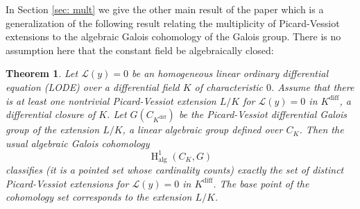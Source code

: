 \documentclass{amsart}
\newtheorem{theorem}{Theorem}[section]
\theoremstyle{definition}
\theoremstyle{remark}
\numberwithin{equation}{section}
\def \HH {\operatorname{H}}
\def \diff {\operatorname{diff}}
\def \alg {\operatorname{alg}}
\begin{document}
In Section \ref{sec: mult} we give the other main result of the paper which is a generalization of the following result relating the multiplicity of Picard-Vessiot extensions to the algebraic Galois cohomology of the Galois group. There is no assumption here that the constant field be algebraically closed:

\begin{theorem}\label{fact: counting PV}\cite{KamenskyPillay}\cite{DeligneMilne2022} Let $\mathcal{L}(y)=0$ be an  homogeneous linear ordinary differential equation (LODE) over a differential field $K$ of characteristic $0$. Assume that there is at least one nontrivial Picard-Vessiot extension $L/K$ for $\mathcal{L}(y)=0$ in $K^{\diff}$, a differential closure of $K$. Let $G(C_{K^{\diff}})$ be the Picard-Vessiot differential Galois group of the extension $L/K$, a linear algebraic group defined over $C_K$. Then the usual algebraic Galois cohomology $$\HH^1_{\alg}(C_K,G)$$
classifies (it is a pointed set whose cardinality counts) exactly the set of distinct Picard-Vessiot extensions for $\mathcal{L}(y)=0$ in $K^{\diff}$. The base point of the cohomology set corresponds to the extension $L/K$.
\end{theorem}





\end{document}
